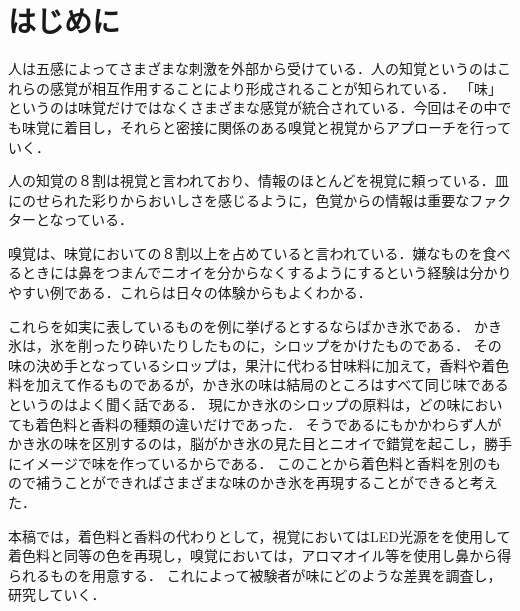 \section{はじめに}
\label{sec:start}

人は五感によってさまざまな刺激を外部から受けている．人の知覚というのはこれらの感覚が相互作用することにより形成されることが知られている．
「味」というのは味覚だけではなくさまざまな感覚が統合されている．今回はその中でも味覚に着目し，それらと密接に関係のある嗅覚と視覚からアプローチを行っていく．

人の知覚の８割は視覚と言われており、情報のほとんどを視覚に頼っている．皿にのせられた彩りからおいしさを感じるように，色覚からの情報は重要なファクターとなっている．

嗅覚は、味覚においての８割以上を占めていると言われている．嫌なものを食べるときには鼻をつまんでニオイを分からなくするようにするという経験は分かりやすい例である．これらは日々の体験からもよくわかる．


これらを如実に表しているものを例に挙げるとするならばかき氷である．
かき氷は，氷を削ったり砕いたりしたものに，シロップをかけたものである．
その味の決め手となっているシロップは，果汁に代わる甘味料に加えて，香料や着色料を加えて作るものであるが，かき氷の味は結局のところはすべて同じ味であるというのはよく聞く話である．
現にかき氷のシロップの原料は，どの味においても着色料と香料の種類の違いだけであった．
そうであるにもかかわらず人がかき氷の味を区別するのは，脳がかき氷の見た目とニオイで錯覚を起こし，勝手にイメージで味を作っているからである．
このことから着色料と香料を別のもので補うことができればさまざまな味のかき氷を再現することができると考えた．

本稿では，着色料と香料の代わりとして，視覚においてはLED光源をを使用して着色料と同等の色を再現し，嗅覚においては，アロマオイル等を使用し鼻から得られるものを用意する．
これによって被験者が味にどのような差異を調査し，研究していく．

